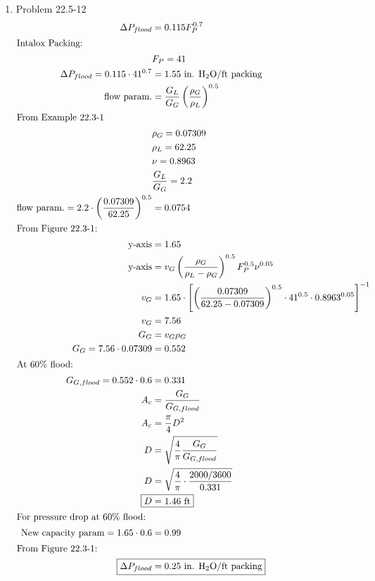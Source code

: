 \documentclass[12pt]{article}
\begin{document}
\begin{enumerate}
\newpage
    \item Problem 22.5-12
    \begin{align*}
        \Delta P_{flood} &= 0.115 F_P^{0.7} \\
        \intertext{Intalox Packing:}
        & F_P = 41 \\
        \Delta P_{flood} = 0.115 \cdot 41^{0.7} &= 1.55 \text{ in. H$_2$O/ft packing} \\
        \text{flow param.} &= \frac{G_L}{G_G} \left(\frac{\rho_G}{\rho_L}\right)^{0.5} \\
        \intertext{From Example 22.3-1}
        & \rho_G = 0.07309 \\
        & \rho_L = 62.25 \\
        & \nu = 0.8963 \\
        & \frac{G_L}{G_G} = 2.2 \\
        \text{flow param.} = 2.2 \cdot \left(\frac{0.07309}{62.25}\right)^{0.5} &= 0.0754 \\
        \intertext{From Figure 22.3-1:}
        \text{y-axis} &= 1.65 \\
        \text{y-axis} &= v_G \left(\frac{\rho_G}{\rho_L - \rho_G}\right)^{0.5} F_P^{0.5} \nu^{0.05} \\
        v_G &= 1.65 \cdot \left[\left(\frac{0.07309}{62.25 - 0.07309}\right)^{0.5} \cdot 41^{0.5} \cdot 0.8963^{0.05}\right]^{-1} \\
        v_G &= 7.56 \\
        G_G &= v_G \rho_G \\
        G_G = 7.56 \cdot 0.07309 &= 0.552 \\
        \intertext{At 60\% flood:}
        G_{G, flood} = 0.552 \cdot 0.6 &= 0.331 \\
        A_c &= \frac{G_G}{G_{G, flood}} \\
        A_c &= \frac{\pi}{4} D^2 \\
        D &= \sqrt{\frac{4}{\pi} \frac{G_G}{G_{G, flood}}} \\
        D &= \sqrt{\frac{4}{\pi} \cdot \frac{2000 / 3600}{0.331}} \\
        \Aboxed{D &= 1.46 \text{ ft}} \\
        \intertext{For pressure drop at 60\% flood:}
        \text{New capacity param} = 1.65 \cdot 0.6 &= 0.99 \\
        \intertext{From Figure 22.3-1:}
        \Aboxed{\Delta P_{flood} &= 0.25 \text{ in. H$_2$O/ft packing}}
    \end{align*}



\end{enumerate}
\end{document}
